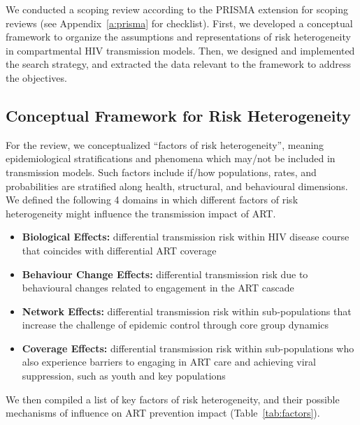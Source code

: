 We conducted a scoping review according to the PRISMA extension for scoping reviews
(see Appendix~\ref{a:prisma} for checklist).
First, we developed a conceptual framework to organize
the assumptions and representations of risk heterogeneity
in compartmental HIV transmission models.
Then, we designed and implemented the search strategy,
and extracted the data relevant to the framework
to address the objectives.
\subsection{Conceptual Framework for Risk Heterogeneity}
\label{ss:meth:framework}
For the review, we conceptualized ``factors of risk heterogeneity'', meaning
epidemiological stratifications and phenomena which may/not be included in transmission models.
Such factors include if/how populations, rates, and probabilities
are stratified along health, structural, and behavioural dimensions.
We defined the following 4 domains in which
different factors of risk heterogeneity might influence the transmission impact of ART.
\begin{itemize}
  \item \textbf{Biological Effects:}
  differential transmission risk within HIV disease course
  that coincides with differential ART coverage
  \cite{Pilcher2004}
  \item \textbf{Behaviour Change Effects:}
  differential transmission risk due to
  behavioural changes related to engagement in the ART cascade
  \cite{Ramachandran2016,Tiwari2020} %
  \item \textbf{Network Effects:}
  differential transmission risk within sub-populations
  that increase the challenge of epidemic control through core group dynamics
  \cite{Anderson1986,Boily1997,Watts2010,Dodd2010}
  \item \textbf{Coverage Effects:}
  differential transmission risk within sub-populations
  who also experience barriers to engaging in ART care and achieving viral suppression,
  such as youth and key populations
  \cite{Mountain2014,Lancaster2016,Hakim2018,Green2020}
\end{itemize}
We then compiled a list of key factors of risk heterogeneity,
and their possible mechanisms of influence on ART prevention impact (Table~\ref{tab:factors}).
